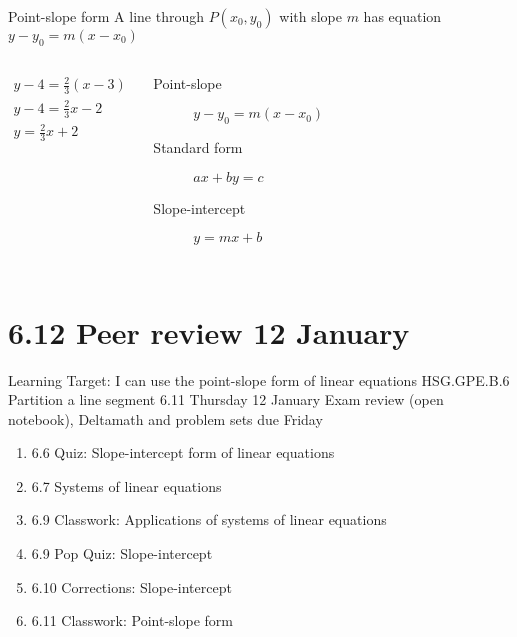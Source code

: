 \begin{frame}{Point-slope form}
  A line through $P(x_0,y_0)$ with slope $m$ has equation $y-y_0=m(x-x_0)$
  \begin{columns}
      \begin{align*}
        y-4=\frac{2}{3}(x-3) \\
        y-4=\frac{2}{3}x-2 \\
        y=\frac{2}{3}x+2
      \end{align*}
      \begin{description}
        \item[Point-slope] $y-y_0=m(x-x_0)$
        \item[Standard form] $ax+by=c$
        \item[Slope-intercept] $y=mx+b$
      \end{description} \bigskip
      \begin{flushright}
      \end{flushright}
  \end{columns}
\end{frame}

\section{6.12 Peer review \hfill 12 January \,}
\begin{frame}{Learning Target: I can use the point-slope form of linear equations}
  {HSG.GPE.B.6 Partition a line segment \hfill \alert{6.11 Thursday 12 January}}
  Exam review (open notebook), Deltamath and problem sets due Friday
  \begin{enumerate}
    \item 6.6 Quiz: Slope-intercept form of linear equations
    \item 6.7 Systems of linear equations
    \item 6.9 Classwork: Applications of systems of linear equations
    \item 6.9 Pop Quiz: Slope-intercept
    \item 6.10 Corrections: Slope-intercept
    \item 6.11 Classwork: Point-slope form
  \end{enumerate}
\end{frame}

